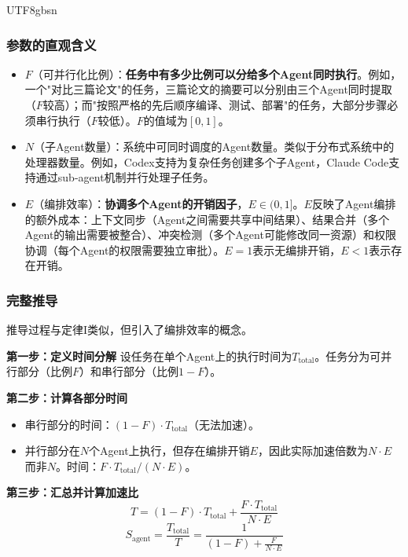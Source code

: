 \documentclass[11pt,a4paper]{article}
\begin{document}
\begin{CJK*}{UTF8}{gbsn}
\subsubsection{参数的直观含义}

\begin{itemize}[nosep]
\item $F$（可并行化比例）：\textbf{任务中有多少比例可以分给多个Agent同时执行}。例如，一个"对比三篇论文"的任务，三篇论文的摘要可以分别由三个Agent同时提取（$F$较高）；而"按照严格的先后顺序编译、测试、部署"的任务，大部分步骤必须串行执行（$F$较低）。$F$的值域为$[0, 1]$。

\item $N$（子Agent数量）：系统中可同时调度的Agent数量。类似于分布式系统中的处理器数量。例如，Codex支持为复杂任务创建多个子Agent\cite{openai_codex_subagents_2026}，Claude Code支持通过sub-agent机制并行处理子任务\cite{anthropic_claudecode_subagents_2026}。

\item $E$（编排效率）：\textbf{协调多个Agent的开销因子}，$E \in (0, 1]$。$E$反映了Agent编排的额外成本：上下文同步（Agent之间需要共享中间结果）、结果合并（多个Agent的输出需要被整合）、冲突检测（多个Agent可能修改同一资源）和权限协调（每个Agent的权限需要独立审批）。$E = 1$表示无编排开销，$E < 1$表示存在开销。
\end{itemize}

\subsubsection{完整推导}

推导过程与定律I类似，但引入了编排效率的概念。

\textbf{第一步：定义时间分解}
设任务在单个Agent上的执行时间为$T_{\mathrm{total}}$。任务分为可并行部分（比例$F$）和串行部分（比例$1-F$）。

\textbf{第二步：计算各部分时间}
\begin{itemize}[nosep]
\item 串行部分的时间：$(1-F) \cdot T_{\mathrm{total}}$（无法加速）。
\item 并行部分在$N$个Agent上执行，但存在编排开销$E$，因此实际加速倍数为$N \cdot E$而非$N$。时间：$F \cdot T_{\mathrm{total}} / (N \cdot E)$。
\end{itemize}

\textbf{第三步：汇总并计算加速比}
\begin{equation}
T = (1-F) \cdot T_{\mathrm{total}} + \frac{F \cdot T_{\mathrm{total}}}{N \cdot E}
\end{equation}
\begin{equation}
S_{\mathrm{agent}} = \frac{T_{\mathrm{total}}}{T} = \frac{1}{(1-F) + \frac{F}{N \cdot E}}
\end{equation}


\end{CJK*}
\end{document}
